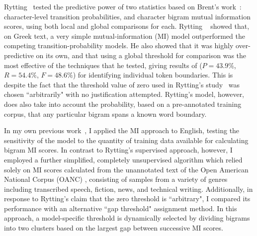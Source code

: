 Rytting~\cite{rytting04} tested the predictive power of two statistics based on Brent's work~\cite{brent99}: character-level transition probabilities, and character bigram mutual information scores, using both local and global comparisons for each. Rytting ~\cite{rytting04} showed that, on Greek text, a very simple mutual-information (MI) model outperformed the competing transition-probability models. He also showed that it was highly over-predictive on its own, and that using a global threshold for comparison was the most effective of the techniques that he tested, giving results of ($P = 43.9\%$, $R = 54.4\%$, $F = 48.6\%$) for identifying individual token boundaries. This is despite the fact that the threshold value of zero used in Rytting's study~\cite{rytting04} was chosen ``arbitrarily" with no justification attempted. Rytting's model, however, does also take into account the probability, based on a pre-annotated training corpus, that any particular bigram spans a known word boundary.

In my own previous work~\cite{kearsley14}, I applied the MI approach to English, testing the sensitivity of the model to the quantity of training data available for calculating bigram MI scores. In contrast to Rytting's supervised approach, however, I employed a further simplified, completely unsupervised algorithm which relied solely on MI scores calculated from the unannotated text of the Open American National Corpus (OANC) \cite{oanc}, consisting of samples from a variety of genres including transcribed speech, fiction, news, and technical writing. Additionally, in response to Rytting's claim that the zero threshold is ``arbitrary", I compared its performance with an alternative ``gap threshold" assignment method. In this approach, a model-specific threshold is dynamically selected by dividing bigrams into two clusters based on the largest gap between successive MI scores.

